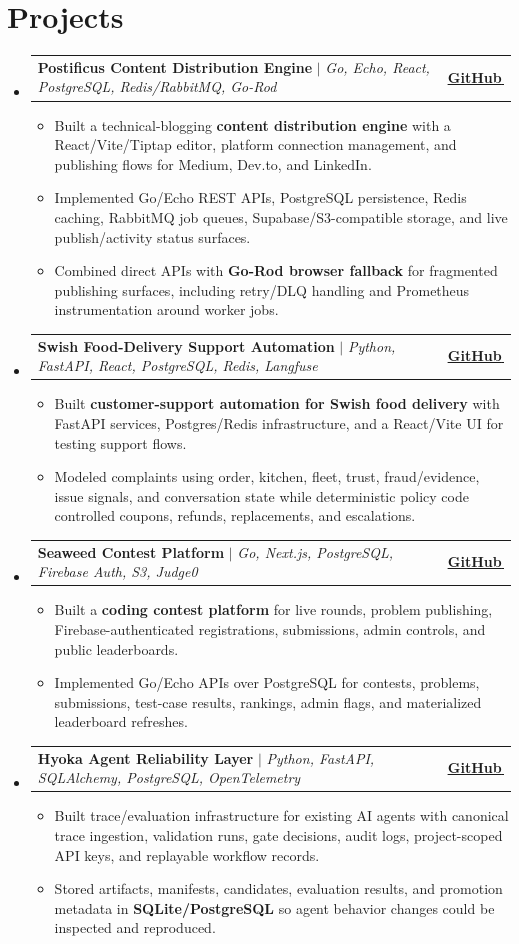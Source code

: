\documentclass[letterpaper,11pt]{article}
\makeatletter
\newcommand{\bodyhref}[2]{\href{#1}{\underline{#2}\,\faExternalLink*}}
\newcommand{\resumeItem}[1]{\item{\fontsize{8.82pt}{9.28pt}\selectfont #1\vspace{-0.7pt}}}
\newcommand{\resumeProjectHeading}[2]{
    \item
    \begin{tabular*}{1.0\textwidth}{l@{\extracolsep{\fill}}r}
      \small#1 & \textbf{\small #2}\\
    \end{tabular*}\vspace{-4pt}
}
\newcommand{\resumeSubHeadingListStart}{\begin{itemize}[leftmargin=0.0in, label={}, itemsep=0.6pt, topsep=0pt, parsep=0pt, partopsep=0pt]}
\newcommand{\resumeSubHeadingListEnd}{\end{itemize}}
\newcommand{\resumeItemListStart}{\begin{itemize}[leftmargin=0.16in,itemsep=0.3pt,topsep=0.9pt,parsep=0pt,partopsep=0pt]}
\newcommand{\resumeItemListEnd}{\end{itemize}\vspace{-3pt}}
\makeatother
\begin{document}
\section{Projects}
\resumeSubHeadingListStart
\resumeProjectHeading
{\textbf{Postificus Content Distribution Engine} $|$ \emph{Go, Echo, React, PostgreSQL, Redis/RabbitMQ, Go-Rod}}{\bodyhref{https://github.com/unichronic/postificus}{GitHub}}
\resumeItemListStart
\resumeItem{Built a technical-blogging \textbf{content distribution engine} with a React/Vite/Tiptap editor, platform connection management, and publishing flows for Medium, Dev.to, and LinkedIn.}
\resumeItem{Implemented Go/Echo REST APIs, PostgreSQL persistence, Redis caching, RabbitMQ job queues, Supabase/S3-compatible storage, and live publish/activity status surfaces.}
\resumeItem{Combined direct APIs with \textbf{Go-Rod browser fallback} for fragmented publishing surfaces, including retry/DLQ handling and Prometheus instrumentation around worker jobs.}
\resumeItemListEnd
\resumeProjectHeading
{\textbf{Swish Food-Delivery Support Automation} $|$ \emph{Python, FastAPI, React, PostgreSQL, Redis, Langfuse}}{\bodyhref{https://github.com/unichronic/swishagent}{GitHub}}
\resumeItemListStart
\resumeItem{Built \textbf{customer-support automation for Swish food delivery} with FastAPI services, Postgres/Redis infrastructure, and a React/Vite UI for testing support flows.}
\resumeItem{Modeled complaints using order, kitchen, fleet, trust, fraud/evidence, issue signals, and conversation state while deterministic policy code controlled coupons, refunds, replacements, and escalations.}
\resumeItemListEnd
\resumeProjectHeading
{\textbf{Seaweed Contest Platform} $|$ \emph{Go, Next.js, PostgreSQL, Firebase Auth, S3, Judge0}}{\bodyhref{https://github.com/unichronic/seaweed-fe}{GitHub}}
\resumeItemListStart
\resumeItem{Built a \textbf{coding contest platform} for live rounds, problem publishing, Firebase-authenticated registrations, submissions, admin controls, and public leaderboards.}
\resumeItem{Implemented Go/Echo APIs over PostgreSQL for contests, problems, submissions, test-case results, rankings, admin flags, and materialized leaderboard refreshes.}
\resumeItemListEnd
\resumeProjectHeading
{\textbf{Hyoka Agent Reliability Layer} $|$ \emph{Python, FastAPI, SQLAlchemy, PostgreSQL, OpenTelemetry}}{\bodyhref{https://github.com/unichronic/hyoka}{GitHub}}
\resumeItemListStart
\resumeItem{Built trace/evaluation infrastructure for existing AI agents with canonical trace ingestion, validation runs, gate decisions, audit logs, project-scoped API keys, and replayable workflow records.}
\resumeItem{Stored artifacts, manifests, candidates, evaluation results, and promotion metadata in \textbf{SQLite/PostgreSQL} so agent behavior changes could be inspected and reproduced.}
\resumeItemListEnd
\resumeSubHeadingListEnd
\end{document}
